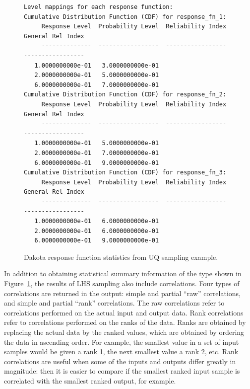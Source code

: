 \begin{figure}[htbp!]
\begin{bigbox}
\begin{footnotesize}
\begin{verbatim}
Level mappings for each response function:
Cumulative Distribution Function (CDF) for response_fn_1:
     Response Level  Probability Level  Reliability Index  General Rel Index
     --------------  -----------------  -----------------  -----------------
   1.0000000000e-01   3.0000000000e-01
   2.0000000000e-01   5.0000000000e-01
   6.0000000000e-01   7.0000000000e-01
Cumulative Distribution Function (CDF) for response_fn_2:
     Response Level  Probability Level  Reliability Index  General Rel Index
     --------------  -----------------  -----------------  -----------------
   1.0000000000e-01   5.0000000000e-01
   2.0000000000e-01   7.0000000000e-01
   6.0000000000e-01   9.0000000000e-01
Cumulative Distribution Function (CDF) for response_fn_3:
     Response Level  Probability Level  Reliability Index  General Rel Index
     --------------  -----------------  -----------------  -----------------
   1.0000000000e-01   6.0000000000e-01
   2.0000000000e-01   6.0000000000e-01
   6.0000000000e-01   9.0000000000e-01
\end{verbatim}
\end{footnotesize}
\end{bigbox}
\caption{Dakota response function statistics from UQ sampling example.}
\label{uq:figure03}
\end{figure}

In addition to obtaining statistical summary information of the type
shown in Figure~\ref{uq:figure03}, the results of LHS sampling also
include correlations. Four types of correlations are returned in the
output: simple and partial ``raw'' correlations, and simple and
partial ``rank'' correlations. The raw correlations refer to
correlations performed on the actual input and output data. Rank
correlations refer to correlations performed on the ranks of the data.
Ranks are obtained by replacing the actual data by the ranked values,
which are obtained by ordering the data in ascending order. For
example, the smallest value in a set of input samples would be given a
rank 1, the next smallest value a rank 2, etc. Rank correlations are
useful when some of the inputs and outputs differ greatly in
magnitude: then it is easier to compare if the smallest ranked input
sample is correlated with the smallest ranked output, for example.

